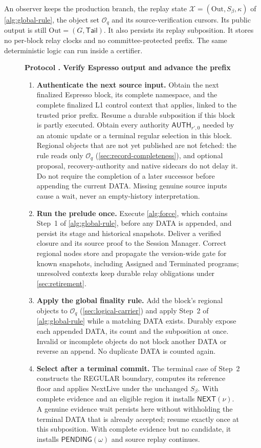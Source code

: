 \documentclass[11pt,a4paper]{article}
\newcommand{\tagg}[1]{\ensuremath{\mathsf{#1}}}
\newcounter{protocol}
\newenvironment{protocol}[3][htbp]{\begin{figure}[#1]\refstepcounter{protocol}\label{#2}
\begin{mdframed}[linewidth=.6pt,skipabove=0pt,skipbelow=0pt,
innertopmargin=7pt,innerbottommargin=7pt]\small
\textbf{Protocol \theprotocol. #3}\par\smallskip}{\end{mdframed}\end{figure}}
\begin{document}
An observer keeps the production branch, the replay state
$\mathcal X=(\mathrm{Out},S_\beta,\kappa)$ of \cref{alg:global-rule}, the
object set $\mathcal O_q$ and its source-verification cursors. Its public
output is still $\mathrm{Out}=(G,\mathsf{Tail})$. It also persists its
replay subposition. It stores no per-block
relay clocks and no committee-protected prefix. The same deterministic
logic can run inside a certifier.

\begin{protocol}{alg:external}{Verify Espresso output and advance the prefix}
\begin{enumerate}[label=\textbf{\arabic*)},itemsep=3pt]
\item \textbf{Authenticate the next source input.} Obtain the next
finalized Espresso block, its complete namespace, and the complete
finalized L1 control context that applies, linked to the trusted prior
prefix. Resume a durable subposition if this block is partly executed.
Obtain every authority $\tagg{AUTH}_{r',0}$ needed by an atomic update or
a terminal regular selection in this block.
Regional objects that are not yet published are not fetched: the rule
reads only $\mathcal O_q$ (\cref{sec:record-completeness}), and optional
proposal, recovery-authority and native sidecars do not delay it. Do not
require the completion of a later successor before appending the
current DATA. Missing genuine source inputs cause a wait, never an
empty-history interpretation.

\item \textbf{Run the prelude once.} Execute \cref{alg:force}, which
contains Step~1 of \cref{alg:global-rule}, before any DATA is appended,
and persist its stage and historical snapshots.
Deliver a verified closure and its source proof to the Session Manager.
Correct regional nodes store and propagate the version-wide gate for
known snapshots, including Assigned and Terminated programs; unresolved
contexts keep durable relay obligations under \cref{sec:retirement}.

\item \textbf{Apply the global finality rule.} Add the block's regional
objects to $\mathcal O_q$ (\cref{sec:logical-carrier}) and apply
Step~2 of \cref{alg:global-rule} while a matching DATA exists.
Durably expose each appended DATA, its count and the subposition at
once. Invalid or incomplete objects do not block another DATA or
reverse an append. No duplicate DATA is counted again.

\item \textbf{Select after a terminal commit.} The terminal case of
Step~2 constructs the REGULAR boundary, computes its reference floor and
applies NextLive under the unchanged $S_\beta$. With complete evidence
and an eligible region it installs $\tagg{NEXT}(\nu)$. A genuine evidence wait persists
here without withholding the terminal DATA that is already accepted;
resume exactly once at this subposition. With complete evidence but no
candidate, it installs $\tagg{PENDING}(\omega)$ and source replay
continues.


\end{enumerate}
\end{protocol}
\end{document}
